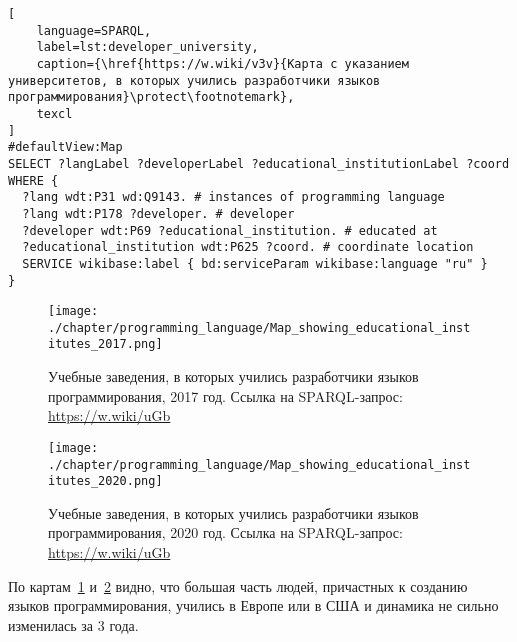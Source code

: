 \begin{lstlisting}[
	language=SPARQL,
	label=lst:developer_university,
	caption={\href{https://w.wiki/v3v}{Карта с указанием университетов, в которых учились разработчики языков программирования}\protect\footnotemark},
	texcl
]
#defaultView:Map
SELECT ?langLabel ?developerLabel ?educational_institutionLabel ?coord
WHERE {
  ?lang wdt:P31 wd:Q9143. # instances of programming language
  ?lang wdt:P178 ?developer. # developer
  ?developer wdt:P69 ?educational_institution. # educated at
  ?educational_institution wdt:P625 ?coord. # coordinate location
  SERVICE wikibase:label { bd:serviceParam wikibase:language "ru" } 	
}
\end{lstlisting}

\begin{figure}[h]
\centering
	\texttt{[image: ./chapter/programming\_language/Map\_showing\_educational\_institutes\_2017.png]}
	\caption[Учебные заведения, в которых учились разработчики языков программирования, 2017 год.]{Учебные заведения, в которых учились разработчики языков программирования, 2017 год. Ссылка на SPARQL-запрос: \href{https://w.wiki/uGb}{https://w.wiki/uGb}}
	\label{fig:universities_2017}
\end{figure}
\begin{figure}[h]
\centering
	\texttt{[image: ./chapter/programming\_language/Map\_showing\_educational\_institutes\_2020.png]}
	\caption[Учебные заведения, в которых учились разработчики языков программирования, 2020 год.]{Учебные заведения, в которых учились разработчики языков программирования, 2020 год. Ссылка на SPARQL-запрос: \href{https://w.wiki/uGb}{https://w.wiki/uGb}}
	\label{fig:universities_2020}
\end{figure}

По картам~\ref{fig:universities_2017} и~\ref{fig:universities_2020} видно, что большая часть людей, причастных к созданию языков программирования, учились в Европе или в США и динамика не сильно изменилась за 3 года.

